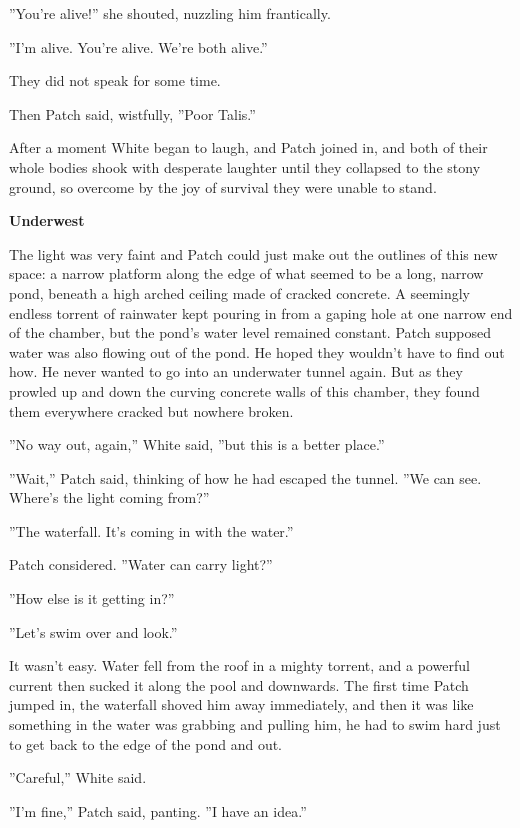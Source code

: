 \documentclass[11pt]{article}
\begin{document}
 ''You're alive!'' she shouted, nuzzling him frantically.\par
 ''I'm alive. You're alive. We're both alive.''\par
 They did not speak for some time.\par
 Then Patch said, wistfully, ''Poor Talis.''\par
 After a moment White began to laugh, and Patch joined in, and both of their whole bodies shook with desperate laughter until they collapsed to the stony ground, so overcome by the joy of survival they were unable to stand.\par
\par
{\bf Underwest\par
}\par
 The light was very faint and Patch could just make out the outlines of this new space: a narrow platform along the edge of what seemed to be a long, narrow pond, beneath a high arched ceiling made of cracked concrete. A seemingly endless torrent of rainwater kept pouring in from a gaping hole at one narrow end of the chamber, but the pond's water level remained constant. Patch supposed water was also flowing out of the pond. He hoped they wouldn't have to find out how. He never wanted to go into an underwater tunnel again. But as they prowled up and down the curving concrete walls of this chamber, they found them everywhere cracked but nowhere broken.\par
 ''No way out, again,'' White said, ''but this is a better place.''\par
 ''Wait,'' Patch said, thinking of how he had escaped the tunnel. ''We can see. Where's the light coming from?''\par
 ''The waterfall. It's coming in with the water.''\par
 Patch considered. ''Water can carry light?''\par
 ''How else is it getting in?''\par
 ''Let's swim over and look.''\par
 It wasn't easy. Water fell from the roof in a mighty torrent, and a powerful current then sucked it along the pool and downwards. The first time Patch jumped in, the waterfall shoved him away immediately, and then it was like something in the water was grabbing and pulling him, he had to swim hard just to get back to the edge of the pond and out.\par
 ''Careful,'' White said.\par
 ''I'm fine,'' Patch said, panting. ''I have an idea.''\par
\end{document}
